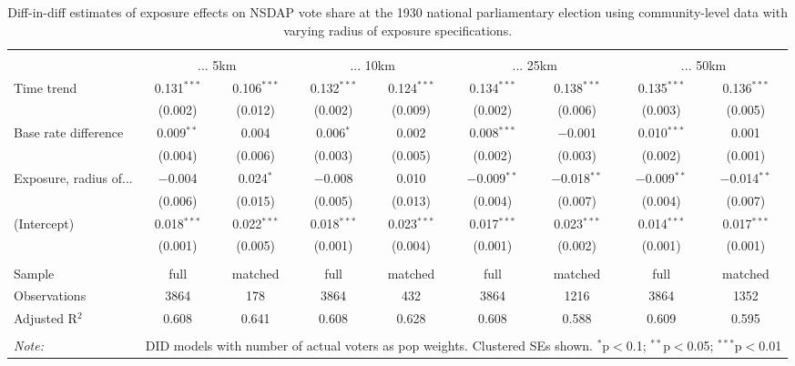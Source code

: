 
\begin{table}[!htbp] \centering 
  \caption{Diff-in-diff estimates of exposure effects on NSDAP vote share at the 1930 national parliamentary election using community-level data with varying radius of exposure specifications.\vspace{-.25cm}} 
  \label{tab:nsdap-voteshare-radius-dd} 
\scriptsize 
\begin{tabular}{@{\extracolsep{5pt}}lcccccccc} 
\\[-1.8ex]\hline 
\hline \\[-1.8ex] 
 & \multicolumn{2}{c}{... 5km} & \multicolumn{2}{c}{... 10km} & \multicolumn{2}{c}{... 25km} & \multicolumn{2}{c}{... 50km} \\ 
 \cmidrule(r){2-3}\cmidrule(r){4-5}\cmidrule(r){6-7}\cmidrule(r){8-9}Time trend & 0.131$^{***}$ & 0.106$^{***}$ & 0.132$^{***}$ & 0.124$^{***}$ & 0.134$^{***}$ & 0.138$^{***}$ & 0.135$^{***}$ & 0.136$^{***}$ \\ 
  & (0.002) & (0.012) & (0.002) & (0.009) & (0.002) & (0.006) & (0.003) & (0.005) \\ 
  Base rate difference & 0.009$^{**}$ & 0.004 & 0.006$^{*}$ & 0.002 & 0.008$^{***}$ & $-$0.001 & 0.010$^{***}$ & 0.001 \\ 
  & (0.004) & (0.006) & (0.003) & (0.005) & (0.002) & (0.003) & (0.002) & (0.001) \\ 
  Exposure, radius of... & $-$0.004 & 0.024$^{*}$ & $-$0.008 & 0.010 & $-$0.009$^{**}$ & $-$0.018$^{**}$ & $-$0.009$^{**}$ & $-$0.014$^{**}$ \\ 
  & (0.006) & (0.015) & (0.005) & (0.013) & (0.004) & (0.007) & (0.004) & (0.007) \\ 
  (Intercept) & 0.018$^{***}$ & 0.022$^{***}$ & 0.018$^{***}$ & 0.023$^{***}$ & 0.017$^{***}$ & 0.023$^{***}$ & 0.014$^{***}$ & 0.017$^{***}$ \\ 
  & (0.001) & (0.005) & (0.001) & (0.004) & (0.001) & (0.002) & (0.001) & (0.001) \\ 
 \hline \\[-1.8ex] 
Sample & full & matched & full & matched & full & matched & full & matched \\ 
Observations & 3864 & 178 & 3864 & 432 & 3864 & 1216 & 3864 & 1352 \\ 
Adjusted R$^{2}$ & 0.608 & 0.641 & 0.608 & 0.628 & 0.608 & 0.588 & 0.609 & 0.595 \\ 
\hline 
\hline \\[-1.8ex] 
\textit{Note:}  & \multicolumn{8}{r}{DID models with number of actual voters as pop weights. Clustered SEs shown. $^{*}$p$<$0.1; $^{**}$p$<$0.05; $^{***}$p$<$0.01} \\ 
\end{tabular} 
\end{table} 
